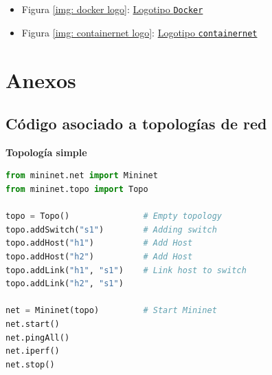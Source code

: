 \documentclass[a4paper, oneside, 12pt]{book}
\begin{document}
\begin{itemize}
		\item Figura \ref{img: docker logo}:
		\label{bib_img: docker logo}
		\href{https://commons.wikimedia.org/wiki/File:Docker_(container_engine)_logo.png}{Logotipo \texttt{Docker}}
		
		\item Figura \ref{img: containernet logo}:
		\label{bib_img: containernet logo}
		\href{https://github.com/containernet/containernet}{Logotipo \texttt{containernet}}
		
		
		
	\end{itemize}

	\pagebreak
	
	\appendix
	
	\chapter{Anexos}
	
	
	
	\section{Código asociado a topologías de red}
	\label{sec: anexo 4}
	
	\vspace{10px}
	\noindent \textbf{\large Topología simple}\\
	
	\begin{lstlisting}[language=Python, caption={Implementación topología simple utilizando \texttt{mininet} (\texttt{basic.py})}, label={lst: topo simple}]
from mininet.net import Mininet
from mininet.topo import Topo

topo = Topo()				# Empty topology
topo.addSwitch("s1")		# Adding switch
topo.addHost("h1")			# Add Host
topo.addHost("h2")			# Add Host
topo.addLink("h1", "s1")	# Link host to switch
topo.addLink("h2", "s1")

net = Mininet(topo)			# Start Mininet
net.start()
net.pingAll()
net.iperf()
net.stop()
	\end{lstlisting}
\end{document}
